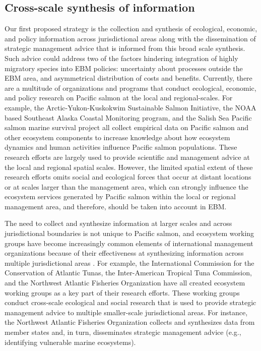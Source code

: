 \subsection{Cross-scale synthesis of information}

Our first proposed strategy is the collection and synthesis of
ecological, economic, and policy information across jurisdictional areas
along with the dissemination of strategic management advice that is
informed from this broad scale synthesis. Such advice could address two
of the factors hindering integration of highly migratory species into
EBM policies: uncertainty about processes outside the EBM area, and
asymmetrical distribution of costs and benefits. Currently, there are a
multitude of organizations and programs that conduct ecological,
economic, and policy research on Pacific salmon at the local and
regional-scales. For example, the Arctic-Yukon-Kuskokwim Sustainable
Salmon Initiative, the NOAA based Southeast Alaska Coastal Monitoring
program, and the Salish Sea Pacific salmon marine survival project all
collect empirical data on Pacific salmon and other ecosystem components
to increase knowledge about how ecosystem dynamics and human activities
influence Pacific salmon populations. These research efforts are largely
used to provide scientific and management advice at the local and
regional spatial scales. However, the limited spatial extent of these
research efforts omits social and ecological forces that occur at
distant locations or at scales larger than the management area, which
can strongly influence the ecosystem services generated by Pacific
salmon within the local or regional management area, and therefore,
should be taken into account in EBM.

The need to collect and synthesize information at larger scales and
across jurisdictional boundaries is not unique to Pacific salmon, and
ecosystem working groups have become increasingly common elements of
international management organizations because of their effectiveness at
synthesizing information across multiple jurisdictional areas
\citep{Engler2015, Lascelles2014}. For example, the International
Commission for the Conservation of Atlantic Tunas, the Inter-American
Tropical Tuna Commission, and the Northwest Atlantic Fisheries
Organization have all created ecosystem working groups as a key part of
their research efforts. These working groups conduct cross-scale
ecological and social research that is used to provide strategic
management advice to multiple smaller-scale jurisdictional areas. For
instance, the Northwest Atlantic Fisheries Organization collects and
synthesizes data from member states and, in turn, disseminates strategic
management advice (e.g., identifying vulnerable marine ecosystems).

